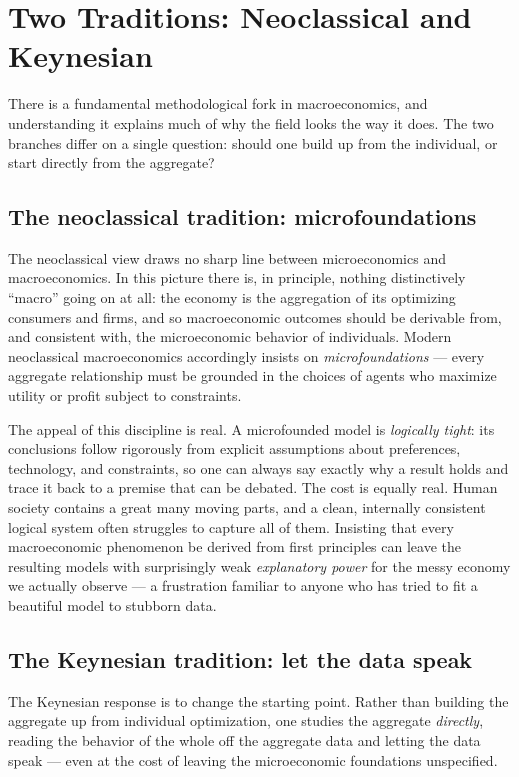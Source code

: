 \section{Two Traditions: Neoclassical and Keynesian}

There is a fundamental methodological fork in macroeconomics, and understanding it explains much of why the field looks the way it does. The two branches differ on a single question: should one build up from the individual, or start directly from the aggregate?

\subsection{The neoclassical tradition: microfoundations}

The neoclassical view draws no sharp line between microeconomics and macroeconomics. In this picture there is, in principle, nothing distinctively ``macro'' going on at all: the economy is the aggregation of its optimizing consumers and firms, and so macroeconomic outcomes should be derivable from, and consistent with, the microeconomic behavior of individuals. Modern neoclassical macroeconomics accordingly insists on \emph{microfoundations} --- every aggregate relationship must be grounded in the choices of agents who maximize utility or profit subject to constraints.

The appeal of this discipline is real. A microfounded model is \emph{logically tight}: its conclusions follow rigorously from explicit assumptions about preferences, technology, and constraints, so one can always say exactly why a result holds and trace it back to a premise that can be debated. The cost is equally real. Human society contains a great many moving parts, and a clean, internally consistent logical system often struggles to capture all of them. Insisting that every macroeconomic phenomenon be derived from first principles can leave the resulting models with surprisingly weak \emph{explanatory power} for the messy economy we actually observe --- a frustration familiar to anyone who has tried to fit a beautiful model to stubborn data.

\subsection{The Keynesian tradition: let the data speak}

The Keynesian response is to change the starting point. Rather than building the aggregate up from individual optimization, one studies the aggregate \emph{directly}, reading the behavior of the whole off the aggregate data and letting the data speak --- even at the cost of leaving the microeconomic foundations unspecified.

